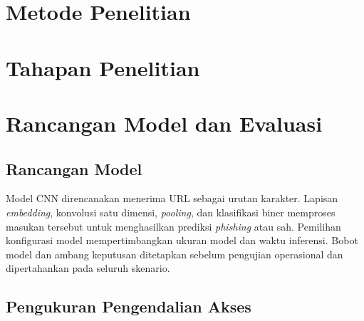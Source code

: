 


\section{Metode Penelitian}
\label{sec:metode-penelitian}


\section{Tahapan Penelitian}
\label{sec:tahapan-penelitian}


\section{Rancangan Model dan Evaluasi}

\subsection{Rancangan Model}

Model CNN direncanakan menerima URL sebagai urutan karakter. Lapisan \textit{embedding}, konvolusi satu dimensi, \textit{pooling}, dan klasifikasi biner memproses masukan tersebut untuk menghasilkan prediksi \textit{phishing} atau sah. Pemilihan konfigurasi model mempertimbangkan ukuran model dan waktu inferensi. Bobot model dan ambang keputusan ditetapkan sebelum pengujian operasional dan dipertahankan pada seluruh skenario.

\subsection{Pengukuran Pengendalian Akses}

